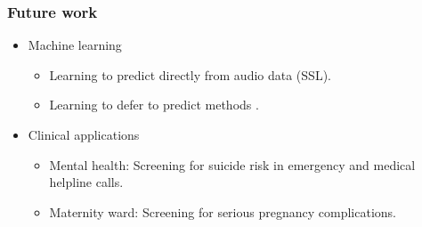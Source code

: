 

\begin{frame}
    \frametitle{Future work}
    \begin{itemize}
        \item Machine learning
        \begin{itemize}
            \item Learning to predict directly from audio data (SSL).
            \item Learning to defer to predict methods \cite{verma_calibrated_2022}.
        \end{itemize}
        \item Clinical applications
        \begin{itemize}
            \item Mental health: Screening for suicide risk in emergency and medical helpline calls.
            \item Maternity ward: Screening for serious pregnancy complications.
        \end{itemize}
    \end{itemize}

\end{frame}
